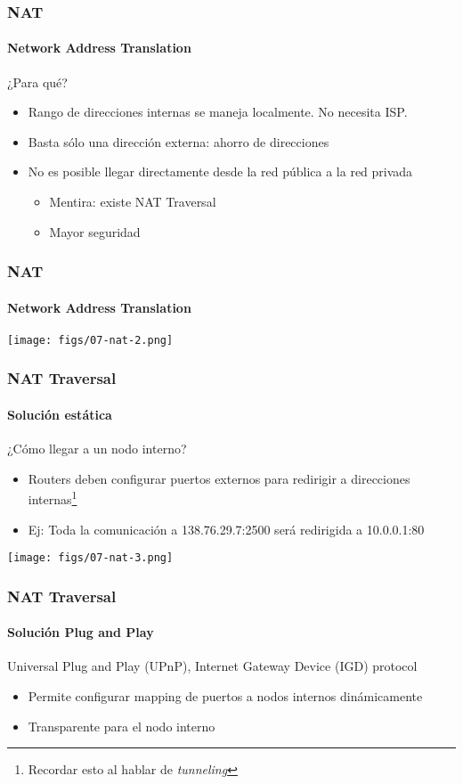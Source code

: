 \documentclass[letter]{beamer}
\begin{document}
\begin{frame}
  \frametitle{NAT}
  \framesubtitle{Network Address Translation}

  ¿Para qué?
  \begin{itemize}
    \item Rango de direcciones internas se maneja localmente. No necesita ISP.
    \item Basta sólo una dirección externa: ahorro de direcciones
    \item No es posible llegar directamente desde la red pública a la red privada
      \begin{itemize}
        \item Mentira: existe NAT Traversal
        \item Mayor seguridad
      \end{itemize}
  \end{itemize}
\end{frame}
\begin{frame}
  \frametitle{NAT}
  \framesubtitle{Network Address Translation}

  \begin{center}
    \texttt{[image: figs/07-nat-2.png]}
  \end{center}

\end{frame}

\begin{frame}
  \frametitle{NAT Traversal}
  \framesubtitle{Solución estática}

   ¿Cómo llegar a un nodo interno?
   \begin{itemize}
     \item Routers deben configurar puertos externos para redirigir a direcciones internas\footnote{Recordar esto al hablar de {\em tunneling}}
     \item Ej: Toda la comunicación a 138.76.29.7:2500 será redirigida a 10.0.0.1:80
   \end{itemize}

  \begin{center}
    \texttt{[image: figs/07-nat-3.png]}
  \end{center}

\end{frame}
\begin{frame}
  \frametitle{NAT Traversal}
  \framesubtitle{Solución Plug and Play}
  
  Universal Plug and Play (UPnP), Internet Gateway Device (IGD) protocol
  \begin{itemize}
    \item Permite configurar mapping de puertos a nodos internos dinámicamente
    \item Transparente para el nodo interno
  \end{itemize}
  
\end{frame}
\end{document}

